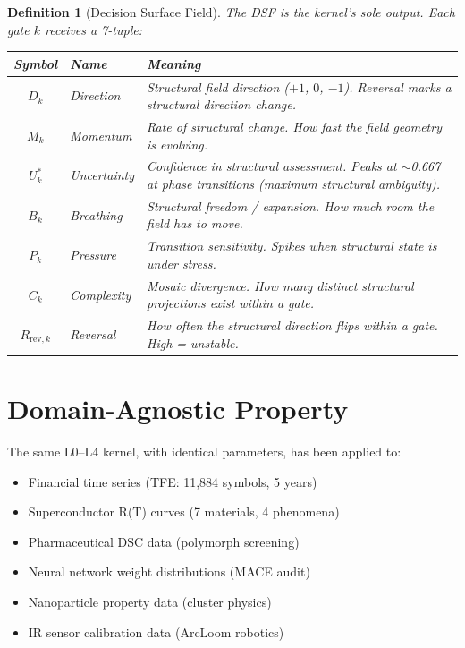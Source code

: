 \documentclass[11pt, a4paper]{article}
\newtheorem{definition}{Definition}[section]
\begin{document}
\begin{definition}[Decision Surface Field]
\label{def:dsf}
The DSF is the kernel's sole output. Each gate $k$ receives
a 7-tuple:

\begin{center}
\begin{tabular}{@{}clp{6cm}@{}}
\toprule
\textbf{Symbol} & \textbf{Name} & \textbf{Meaning} \\
\midrule
$D_k$ & Direction & Structural field direction
  ($+1$, $0$, $-1$). Reversal marks a structural
  direction change. \\
$M_k$ & Momentum & Rate of structural change. How fast
  the field geometry is evolving. \\
$U^*_k$ & Uncertainty & Confidence in structural
  assessment. Peaks at $\sim$0.667 at phase transitions
  (maximum structural ambiguity). \\
$B_k$ & Breathing & Structural freedom / expansion.
  How much room the field has to move. \\
$P_k$ & Pressure & Transition sensitivity. Spikes when
  structural state is under stress. \\
$C_k$ & Complexity & Mosaic divergence. How many distinct
  structural projections exist within a gate. \\
$R_{\text{rev},k}$ & Reversal & How often the structural
  direction flips within a gate. High = unstable. \\
\bottomrule
\end{tabular}
\end{center}
\end{definition}

\section{Domain-Agnostic Property}

The same L0--L4 kernel, with identical parameters, has been
applied to:
\begin{itemize}[nosep]
  \item Financial time series (TFE: 11,884 symbols, 5 years)
  \item Superconductor R(T) curves (7 materials, 4 phenomena)
  \item Pharmaceutical DSC data (polymorph screening)
  \item Neural network weight distributions (MACE audit)
  \item Nanoparticle property data (cluster physics)
  \item IR sensor calibration data (ArcLoom robotics)
\end{itemize}
\end{document}

